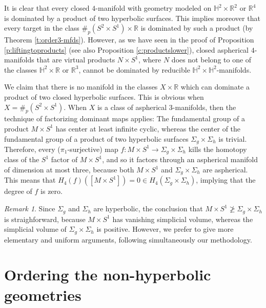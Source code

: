 \documentclass[12pt]{amsart}
\theoremstyle{remark}
\newtheorem{rem}[thm]{Remark}
\begin{document}
\medskip
{} It is clear that every closed $4$-manifold with geometry modeled on $\mathbb{H}^2 \times {\mathbb{R}}^2$ or ${\mathbb{R}}^4$ is dominated by a product of two hyperbolic
surfaces. This implies moreover that every target in the class $\#_p (S^2 \times S^1) \times {\mathbb{R}}$ is dominated by such a product (by Theorem \ref{t:order3-mfds}). However, as we have seen in the proof of Proposition \ref{p:liftingtoproducts} (see also Proposition \ref{c:productslower}), closed aspherical $4$-manifolds that are virtual products $N \times S^1$, where $N$ does not belong to one of the classes $\mathbb{H}^2 \times {\mathbb{R}}$ or ${\mathbb{R}}^3$, cannot be dominated by reducible $\mathbb{H}^2\times \mathbb{H}^2$-manifolds.

\medskip
{} 
We claim that there is no manifold in the classes $X \times {\mathbb{R}}$ which can dominate a product of two closed hyperbolic surfaces. This is obvious when $X = \#_p (S^2 \times S^1)$. When $X$ is a class of aspherical $3$-manifolds, then the technique of factorizing dominant maps applies: The fundamental group of a product $M \times S^1$ has center at least infinite cyclic, whereas the center of the fundamental group of a product of two hyperbolic surfaces $\Sigma_g \times \Sigma_h$ is trivial. Therefore, every ($\pi_1$-surjective) map $f \colon M \times S^1 \longrightarrow \Sigma_g \times \Sigma_h$ kills the homotopy class of the $S^1$ factor of $ M \times S^1$, and so it factors through an aspherical manifold of dimension at most three, because both $M \times S^1$ and $\Sigma_g \times \Sigma_h$ are aspherical. This means that $H_4(f)([M \times S^1]) = 0 \in H_4(\Sigma_g \times \Sigma_h)$, implying that the degree of $f$ is zero.

\begin{rem}\label{r:othertech}
Since $\Sigma_g$ and $\Sigma_h$ are hyperbolic, the conclusion that $M \times S^1 \ngeq \Sigma_g \times \Sigma_h$ is straighforward, because $M \times S^1$ has vanishing simplicial volume, whereas the simplicial volume of $\Sigma_g \times \Sigma_h$ is positive. 
However, we prefer to give more elementary and uniform arguments, following simultaneously our methodology.
\end{rem}

\section{Ordering the non-hyperbolic geometries}\label{s:proofend}
\end{document}
